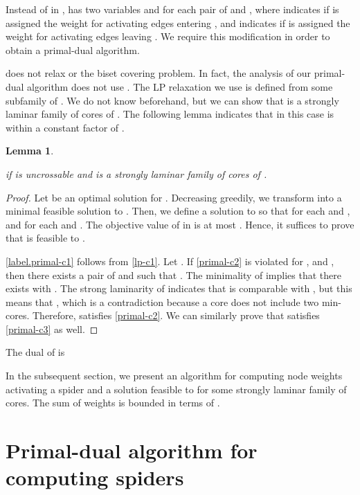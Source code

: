 \documentclass[11pt]{article}
\newtheorem{lemma}{Lemma}
\begin{document}
Instead of  in ,  has two variables  and
 for each pair of  and , where
 indicates if  is assigned the weight  for
activating edges entering , and 
 indicates if  is assigned the weight  for
activating edges leaving .
We require this modification in order to obtain a primal-dual algorithm.


 does not relax 
or the biset covering problem.
In fact, the analysis of our primal-dual algorithm does not use .
The LP relaxation we use is  defined from some
subfamily  of .
We do not know  beforehand, but we can show that
 is a strongly laminar family of cores of .
The following lemma indicates that in this case
 is within a constant factor of .

\begin{lemma}\label{lem.corelpvslp}
  
 if  is uncrossable and  is a strongly laminar family of
 cores of .
 \end{lemma}
 \begin{proof}
  Let  be an optimal solution for .
  Decreasing  greedily,
  we transform  into a minimal feasible solution to .
  Then, we define a solution  to 
  so that  for each  and
  , and
   for each  and
  . The objective value of  in 
  is at most .
  Hence, it suffices to prove that  is feasible to .

  \eqref{label.primal-c1} follows from \eqref{lp-c1}.
  Let .
  If \eqref{primal-c2} is violated for ,  and ,
  then there exists a pair of 
  and  such that 
  .
  The minimality of  implies that 
  there exists 
  with .
  The strong laminarity of  indicates that 
   is comparable with , but this 
  means that , which is a contradiction
  because 
  a core does not include two min-cores.
  Therefore,  satisfies \eqref{primal-c2}.
  We can similarly prove that  satisfies \eqref{primal-c3} as well.
 \end{proof}


The dual of  is 



In the subsequent section, we present an algorithm for computing
node weights activating a spider 
and a solution  feasible to 
for some strongly laminar family  of cores.
The sum of weights  is bounded in terms
of .


\section{Primal-dual algorithm for computing spiders}
\label{sec.primal-dual}
\end{document}
